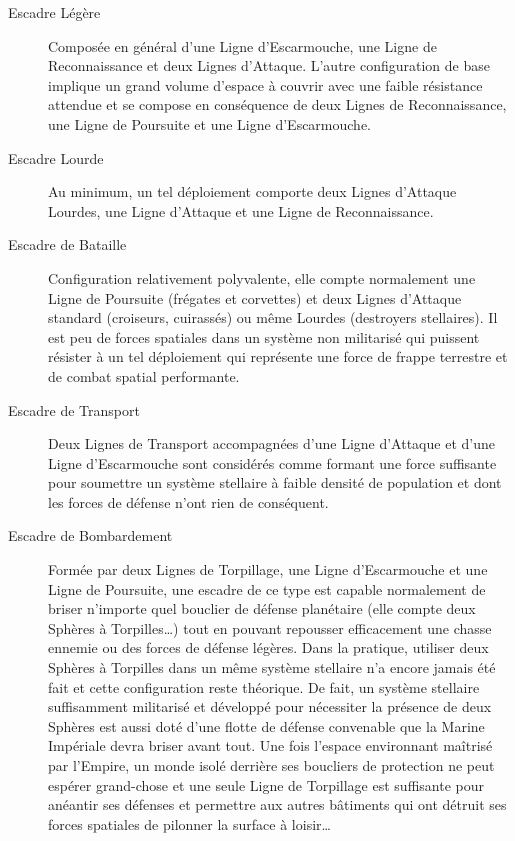 \documentclass[twoside]{article}
\begin{document}
\begin{description}
	\item[Escadre Légère] Composée en général d'une Ligne d'Escarmouche, une Ligne de Reconnaissance et deux Lignes d'Attaque. L'autre configuration de base implique un grand volume d'espace à couvrir avec une faible résistance attendue et se compose en conséquence de deux Lignes de Reconnaissance, une Ligne de Poursuite et une Ligne d'Escarmouche.
	\item[Escadre Lourde] Au minimum, un tel déploiement comporte deux Lignes d'Attaque Lourdes, une Ligne d'Attaque et une Ligne de Reconnaissance.
	\item[Escadre de Bataille] Configuration relativement polyvalente, elle compte normalement une Ligne de Poursuite (frégates et corvettes) et deux Lignes d'Attaque standard (croiseurs, cuirassés) ou même Lourdes (destroyers stellaires). Il est peu de forces spatiales dans un système non militarisé qui puissent résister à un tel déploiement qui représente une force de frappe terrestre et de combat spatial performante.
	\item[Escadre de Transport] Deux Lignes de Transport accompagnées d'une Ligne d'Attaque et d'une Ligne d'Escarmouche sont considérés comme formant une force suffisante pour soumettre un système stellaire à faible densité de population et dont les forces de défense n'ont rien de conséquent.
	\item[Escadre de Bombardement] Formée par deux Lignes de Torpillage, une Ligne d'Escarmouche et une Ligne de Poursuite, une escadre de ce type est capable normalement de briser n'importe quel bouclier de défense planétaire (elle compte deux Sphères à Torpilles\ldots) tout en pouvant repousser efficacement une chasse ennemie ou des forces de défense légères. Dans la pratique, utiliser deux Sphères à Torpilles dans un même système stellaire n'a encore jamais été fait et cette configuration reste théorique. De fait, un système stellaire suffisamment militarisé et développé pour nécessiter la présence de deux Sphères est aussi doté d'une flotte de défense convenable que la Marine Impériale devra briser avant tout. Une fois l'espace environnant ma\^{i}trisé par l'Empire, un monde isolé derrière ses boucliers de protection ne peut espérer grand-chose et une seule Ligne de Torpillage est suffisante pour anéantir ses défenses et permettre aux autres bâtiments qui ont détruit ses forces spatiales de pilonner la surface à loisir\ldots
\end{description}
\end{document}
